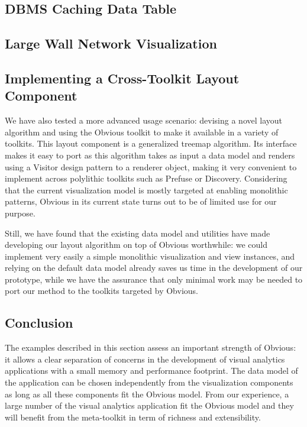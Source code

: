 \subsection{DBMS Caching Data Table}


\subsection{Large Wall Network Visualization}


\subsection{Implementing a Cross-Toolkit Layout Component}

We have also tested a more advanced usage scenario: devising
a novel layout algorithm and using the Obvious toolkit to make it
available in a variety of toolkits. This layout component is a
generalized treemap algorithm.
Its interface makes it easy to port as this
algorithm takes as input a data model and renders using a Visitor
design pattern to a renderer object, making it very convenient to
implement across polylithic toolkits such as Prefuse or Discovery.
Considering that the current visualization model is mostly targeted at
enabling monolithic patterns, Obvious in its current state turns out
to be of limited use for our purpose.

Still, we have found that the existing data model and utilities have
made developing our layout algorithm on top of Obvious worthwhile: we
could implement very easily a simple monolithic visualization and
view instances, and relying on the default data model already saves us
time in the development of our prototype, while we have the assurance
that only minimal work may be needed to port our method to the
toolkits targeted by Obvious.


\subsection{Conclusion}

The examples described in this section assess an important strength of
Obvious: it allows a clear separation of concerns in the development
of visual analytics applications with a small memory and performance
footprint.  The data model of the application can be chosen
independently from the visualization components as long as all these
components fit the Obvious model.  From our experience, a large number
of the visual analytics application fit the Obvious model and they
will benefit from the meta-toolkit in term of richness and
extensibility.

